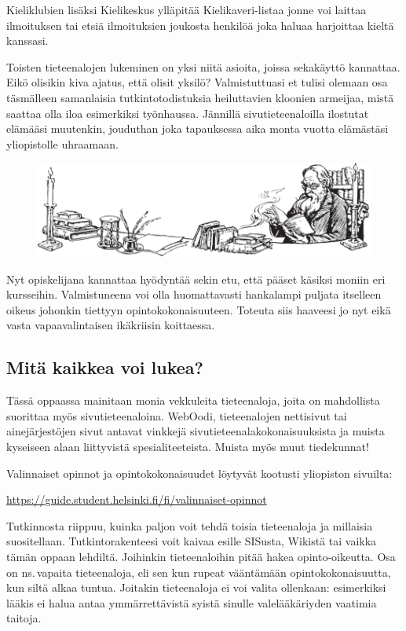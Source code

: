 \documentclass[a5paper, 8pt, twocolumn]{book} %
\numberwithin{equation}{section}
\begin{document}
Kieliklubien lisäksi Kielikeskus ylläpitää
Kielikaveri-listaa jonne voi laittaa
ilmoituksen tai etsiä ilmoituksien joukosta
henkilöä joka haluaa harjoittaa kieltä kanssasi.

Toisten tieteenalojen lukeminen on yksi niitä
asioita, joissa sekakäyttö kannattaa. Eikö
olisikin kiva ajatus, että olisit yksilö? Valmistuttuasi
et tulisi olemaan osa täsmälleen
samanlaisia tutkintotodistuksia heiluttavien
kloonien armeijaa, mistä saattaa olla iloa
esimerkiksi työnhaussa. Jännillä sivutieteenaloilla
ilostutat elämääsi muutenkin, jouduthan
joka tapauksessa aika monta vuotta elämästäsi
yliopistolle uhraamaan.
\begin{figure}[!b]
	\centering
	\includegraphics[width=\textwidth]{sivuaineproffa.png}
\end{figure}

Nyt opiskelijana kannattaa hyödyntää
sekin etu, että pääset käsiksi moniin eri kursseihin.
Valmistuneena voi olla huomattavasti
hankalampi puljata itselleen oikeus
johonkin tiettyyn opintokokonaisuuteen.
Toteuta siis haaveesi jo nyt eikä vasta vapaavalintaisen
ikäkriisin koittaessa.
\subsection*{Mitä kaikkea voi lukea?}
Tässä oppaassa mainitaan monia vekkuleita
tieteenaloja, joita on mahdollista
suorittaa myös sivutieteenaloina.
WebOodi, tieteenalojen nettisivut tai ainejärjestöjen
sivut antavat vinkkejä sivutieteenalakokonaisuuksista
ja muista kyseiseen alaan
liittyvistä spesialiteeteista. Muista myös
muut tiedekunnat!

Valinnaiset opinnot ja opintokokonaisuudet löytyvät kootusti yliopiston sivuilta:

\noindent\url{https://guide.student.helsinki.fi/fi/valinnaiset-opinnot}

Tutkinnosta riippuu, kuinka paljon voit
tehdä toisia tieteenaloja ja millaisia suositellaan.
Tutkintorakenteesi voit kaivaa esille
SISusta, Wikistä tai vaikka tämän oppaan lehdiltä.
Joihinkin tieteen\-aloihin pitää hakea opinto-oikeutta. Osa on ns.\,vapaita tieteenaloja,
eli sen kun rupeat vääntämään opintokokonaisuutta,
kun siltä alkaa tuntua. Joitakin
tieteenaloja ei voi valita ollenkaan:
esimerkiksi lääkis ei halua antaa ymmärrettävistä
syistä sinulle valelääkäriyden vaatimia
taitoja.
\end{document}

